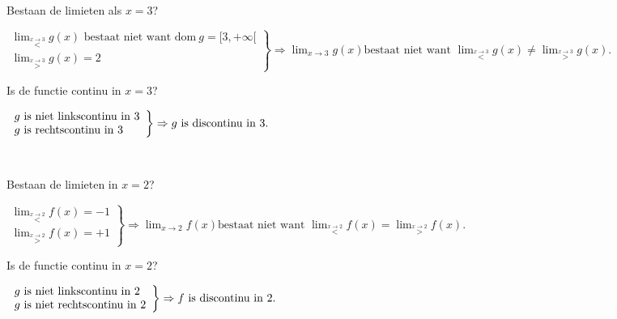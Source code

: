 \begin{voorbeeld}
	\ \\
	
Bestaan de limieten als $x=3$?

\begin{math}
\left. \begin{array}{l}
\lim_{\overset{x\rightarrow3}{<}}g(x) \text{ bestaat niet want dom} \ g=[3,+\infty[\\
 \lim_{\overset{x\rightarrow3}{>}}g(x)=2
\end{array}
\right\}
\Rightarrow \lim_{x\to3}g(x) \text{bestaat niet want } \lim_{\overset{x\rightarrow3}{<}}g(x) \neq \lim_{\overset{x\rightarrow3}{>}}g(x).
\end{math}

Is de functie continu in $x=3$?

\begin{math}
\centering
\left. \begin{array}{l}
g \text{ is niet linkscontinu in }3\\
g \text{ is rechtscontinu in }3
\end{array}
\right\}
\Rightarrow g \text{ is discontinu in }3.
\end{math}

\end{voorbeeld}
\begin{voorbeeld}
	\ \\

Bestaan de limieten in $x=2$?

\begin{math}
\left. \begin{array}{l}
\lim_{\overset{x\rightarrow2}{<}}f(x)=-1 \\
 \lim_{\overset{x\rightarrow2}{>}}f(x)=+1
\end{array}
\right\}
\Rightarrow \lim_{x\to2}f(x) \text{bestaat niet want } \lim_{\overset{x\rightarrow2}{<}}f(x) = \lim_{\overset{x\rightarrow2}{>}}f(x).
\end{math}

Is de functie continu in $x=2$?

\begin{math}
\centering
\left. \begin{array}{l}
g \text{ is niet linkscontinu in }2\\
g \text{ is niet rechtscontinu in }2
\end{array}
\right\}
\Rightarrow f \text{ is discontinu in }2.
\end{math}


\end{voorbeeld}


